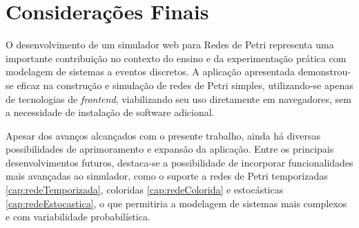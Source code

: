 \documentclass[
	12pt,				%
	openright,			%
	oneside,			%
	a4paper,			%
	english,			%
	brazil				%
	]{abntex2}
\begin{document}







\chapter{Considerações Finais} \label{cap:resultados}

O desenvolvimento de um simulador web para Redes de Petri representa uma importante contribuição no contexto do ensino e da experimentação prática com modelagem de sistemas a eventos discretos. A aplicação apresentada demonstrou-se eficaz na construção e simulação de redes de Petri simples, utilizando-se apenas de tecnologias de \textit{frontend}, viabilizando seu uso diretamente em navegadores, sem a necessidade de instalação de software adicional.

Apesar dos avanços alcançados com o presente trabalho, ainda há diversas possibilidades de aprimoramento e expansão da aplicação. Entre os principais desenvolvimentos futuros, destaca-se a possibilidade de incorporar funcionalidades mais avançadas ao simulador, como o suporte a redes de Petri temporizadas \ref{cap:redeTemporizada}, coloridas \ref{cap:redeColorida} e estocásticas \ref{cap:redeEstocastica}, o que permitiria a modelagem de sistemas mais complexos e com variabilidade probabilística.
\end{document}
